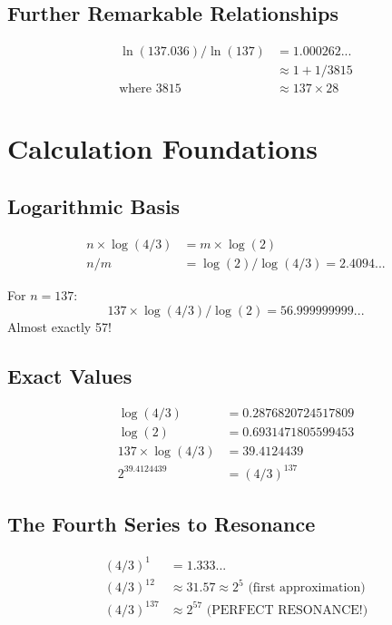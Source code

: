 \documentclass[12pt,a4paper]{article}
\begin{document}
	\subsection{Further Remarkable Relationships}
	
	\begin{align}
		\ln(137.036) / \ln(137) &= 1.000262...\\
		&\approx 1 + 1/3815\\
		\text{where } 3815 &\approx 137 \times 28
	\end{align}
	
	\section{Calculation Foundations}
	
	\subsection{Logarithmic Basis}
	
	\begin{align}
		n \times \log(4/3) &= m \times \log(2)\\
		n/m &= \log(2)/\log(4/3) = 2.4094...
	\end{align}
	
	For $n=137$:
	\begin{equation}
		137 \times \log(4/3) / \log(2) = 56.999999999...
	\end{equation}
	Almost exactly 57!
	
	\subsection{Exact Values}
	
	\begin{align}
		\log(4/3) &= 0.2876820724517809\\
		\log(2) &= 0.6931471805599453\\
		137 \times \log(4/3) &= 39.4124439\\
		2^{39.4124439} &= (4/3)^{137}
	\end{align}
	
	\subsection{The Fourth Series to Resonance}
	
	\begin{align}
		(4/3)^1 &= 1.333...\\
		(4/3)^{12} &\approx 31.57 \approx 2^5 \text{ (first approximation)}\\
		(4/3)^{137} &\approx 2^{57} \text{ (PERFECT RESONANCE!)}
	\end{align}
	
\end{document}
